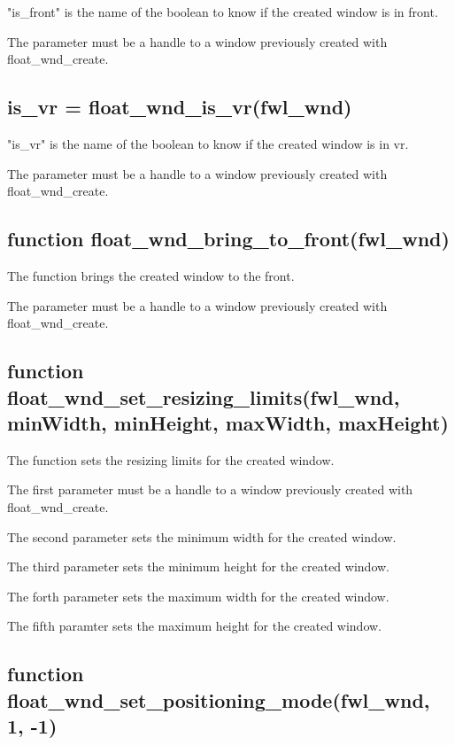 \documentclass[11pt,parskip=half,a4paper]{scrartcl}
\begin{document}
"is\_front" is the name of the boolean to know if the created window is in front.

The parameter must be a handle to a window previously created with float\_wnd\_create.

\subsection{\hspace*{1.0mm}is\_vr = float\_wnd\_is\_vr(fwl\_wnd)}

"is\_vr" is the name of the boolean to know if the created window is in vr.

The parameter must be a handle to a window previously created with float\_wnd\_create.

\subsection{\hspace*{1.0mm}function float\_wnd\_bring\_to\_front(fwl\_wnd)}

The function brings the created window to the front.

The parameter must be a handle to a window previously created with float\_wnd\_create.

\subsection{\hspace*{1.0mm}function float\_wnd\_set\_resizing\_limits(fwl\_wnd, minWidth, minHeight, maxWidth, maxHeight)}

The function sets the resizing limits for the created window.

The first parameter must be a handle to a window previously created with float\_wnd\_create.

The second parameter sets the  minimum width for the created window.

The third parameter sets the  minimum height for the created window.

The forth parameter sets the maximum width for the created window.

The fifth paramter sets the maximum height for the created window.

\subsection{\hspace*{1.0mm}function float\_wnd\_set\_positioning\_mode(fwl\_wnd, 1, -1)}
\end{document}
